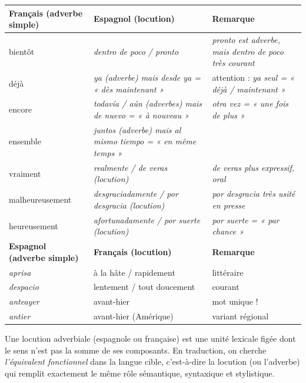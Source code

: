 \documentclass[11pt]{article}
\newcommand{\cle}[1]{{\popxbold\color{popdark}#1}}
\newcommand{\esp}[1]{\ifmmode\text{\textit{#1}}\else\begingroup\selectlanguage{spanish}\itshape #1\endgroup\fi}
\begin{document}
\begin{center}
\begin{tabularx}{\linewidth}{|X|X|X|}
\hline
\rowcolor{poporangeL}
\textbf{Français (adverbe simple)} & \textbf{Espagnol (locution)} & \textbf{Remarque} \\
\hline
bientôt & \esp{dentro de poco} / \esp{pronto} & \esp{pronto} est adverbe, mais \esp{dentro de poco} très courant \\
\hline
déjà & \esp{ya} (adverbe) mais \esp{desde ya} = « dès maintenant » & attention : \esp{ya} seul = « déjà / maintenant » \\
\hline
encore & \esp{todavía} / \esp{aún} (adverbes) mais \esp{de nuevo} = « à nouveau » & \esp{otra vez} = « une fois de plus » \\
\hline
ensemble & \esp{juntos} (adverbe) mais \esp{al mismo tiempo} = « en même temps » & \\
\hline
vraiment & \esp{realmente} / \esp{de veras} (locution) & \esp{de veras} plus expressif, oral \\
\hline
malheureusement & \esp{desgraciadamente} / \esp{por desgracia} (locution) & \esp{por desgracia} très usité en presse \\
\hline
heureusement & \esp{afortunadamente} / \esp{por suerte} (locution) & \esp{por suerte} = « par chance » \\
\hline
\rowcolor{popgreenL}
\textbf{Espagnol (adverbe simple)} & \textbf{Français (locution)} & \textbf{Remarque} \\
\hline
\esp{aprisa} & à la hâte / rapidement & littéraire \\
\hline
\esp{despacio} & lentement / tout doucement & courant \\
\hline
\esp{anteayer} & avant-hier & mot unique ! \\
\hline
\esp{antier} & avant-hier (Amérique) & variant régional \\
\hline
\end{tabularx}
\end{center}

\begin{propriete}
Une locution adverbiale (espagnole ou française) est une \cle{unité lexicale figée} dont le sens n'est pas la somme de ses composants. En traduction, on cherche \emph{l'\cle{équivalent fonctionnel}} dans la langue cible, c'est-à-dire la locution (ou l'adverbe) qui remplit exactement le même rôle sémantique, syntaxique et stylistique.
\end{propriete}
\end{document}
